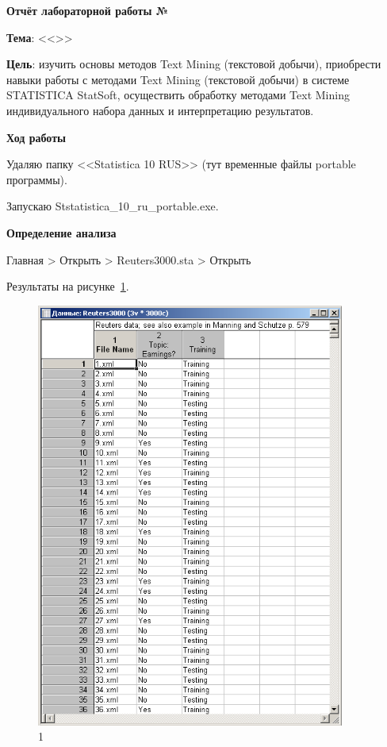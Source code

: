 \begin{center}
  \textbf{Отчёт лабораторной работы №\envReportLabNumber}
\end{center}

\textbf{Тема}:
<<\envReportTitle>>

\textbf{Цель}:
изучить основы методов Text Mining (текстовой добычи), приобрести
навыки работы с методами Text Mining (текстовой добычи) в системе
STATISTICA StatSoft, осуществить обработку методами Text Mining
индивидуального набора данных и интерпретацию результатов.

\begin{center}
  \textbf{Ход работы}
\end{center}

Удаляю папку <<Statistica 10 RUS>> (тут временные файлы portable программы).

Запускаю Ststatistica\_10\_ru\_portable.exe.

\begin{center}
  \textbf{Определение анализа}
\end{center}

Главная > Открыть > Reuters3000.sta  > Открыть

Результаты на рисунке~\ref{fig:1}.

\begin{figure}[!h]
  \centering

  \includegraphics[height=14cm]
  {inc/1.PNG}

  \caption{1}

  \label{fig:1}
\end{figure}

